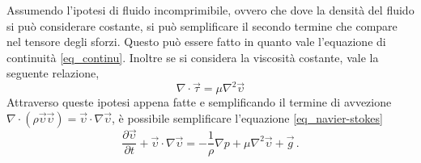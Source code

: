 Assumendo l'ipotesi di fluido incomprimibile, ovvero che dove la densità del 
fluido si può considerare costante, si può semplificare il secondo termine che 
compare nel tensore degli sforzi. Questo può essere fatto in quanto vale l'equazione di continuità 
\eqref{eq_continu}.
Inoltre se si considera la viscosità costante, vale la seguente relazione,
\begin{equation}
\nabla \cdot \vec{\tau} = \mu \nabla^2 \vec{\upsilon}
\end{equation}
Attraverso queste ipotesi appena fatte e semplificando il termine di avvezione 
$\nabla \cdot (\rho 
\vec{\upsilon}\vec{\upsilon})=\vec{\upsilon}\cdot\nabla\vec{\upsilon}$, è 
possibile semplificare l'equazione \eqref{eq_navier-stokes}
\begin{equation}
\frac{\partial \vec{\upsilon}}{\partial t} + 
\vec{\upsilon}\cdot\nabla\vec{\upsilon} = -\frac{1}{\rho} \nabla p + \mu 
\nabla^2\vec{\upsilon}+\vec{g} \,.
\end{equation}

